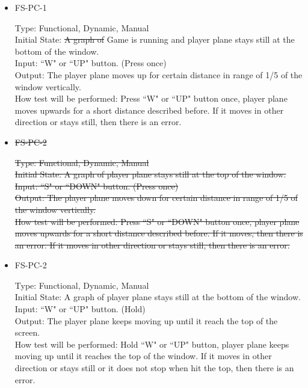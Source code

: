 \documentclass[12pt, titlepage]{article}
\begin{document}
\begin{itemize}

\item{FS-PC-1\\}

Type: Functional, Dynamic, Manual\\
Initial State: \sout{A graph of} {\color{red}Game is running and} player plane stays still at the bottom of the window.\\
Input: ``W" or ``UP" button. (Press once)\\
Output: The player plane moves up for certain distance {\color{red}in range of 1/5 of the window vertically.}\\
How test will be performed: Press ``W" or ``UP" button once, player plane moves upwards for a short distance {\color{red}described before.} If it moves in other direction or stays still, then there is an error.
					
\item{\sout{FS-PC-2}}

\sout{Type: Functional, Dynamic, Manual}\\
\sout{Initial State: A graph of player plane stays still at the top of the window.}\\
\sout{Input: ``S" or ``DOWN" button. (Press once)}\\
\sout{Output: The player plane moves down for certain distance in range of 1/5 of the window vertically.}\\
\sout{How test will be performed: Press ``S" or ``DOWN" button once, player plane moves upwards for a short distance described before. If it moves, then there is an error. If it moves in other direction or stays still, then there is an error.}

\item{FS-PC-{\color{red}2}\\}

Type: Functional, Dynamic, Manual\\
Initial State: A graph of player plane stays still at the bottom of the window.\\
Input: ``W" or ``UP" button. (Hold)\\
Output: The player plane keeps moving up until it reach the top of the screen.\\
How test will be performed: Hold ``W" or ``UP" button, player plane keeps moving up until it reaches the top of the window. If it moves in other direction or stays still or it does not stop when hit the top, then there is an error.


\end{itemize}
\end{document}
